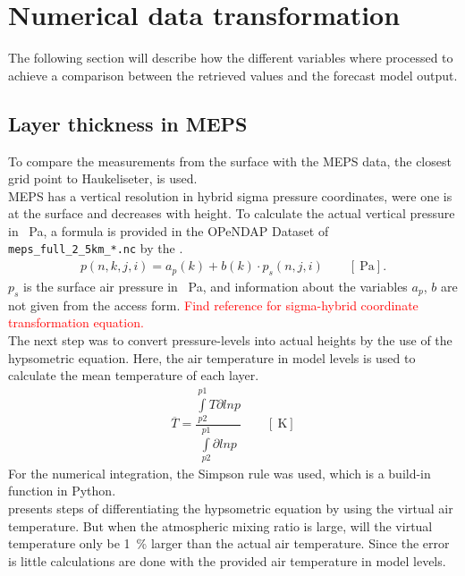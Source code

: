 \section{Numerical data transformation} \label{sec:data_proc}
The following section will describe how the different variables where processed to achieve a comparison between the retrieved values and the forecast model output. 

\subsection{Layer thickness in MEPS}\label{sec:layer_thickness}
To compare the measurements from the surface with the MEPS data, the closest grid point to Haukeliseter, is used.
\\
MEPS has a vertical resolution in hybrid sigma pressure coordinates, were one is at the surface and decreases with height. To calculate the actual vertical pressure in \SI{}{\Pa}, a formula is provided in the OPeNDAP Dataset of \texttt{meps\_full\_2\_5km\_*.nc} by the \citet{norwegian_meteorological_institute_met_2016}.  
\begin{align}
	p(n,k,j,i) = a_p(k) + b(k) \cdot p_s(n,j,i) \qquad [\SI{}{\Pa}].
	\label{eq:hybrid_sigma_pressure}
\end{align}
$p_s$ is the surface air pressure in \SI{}{\Pa}, and information about the variables $a_p$, $b$ are not given from the access form. \textcolor{red}{Find reference for sigma-hybrid coordinate transformation equation.}  
\\
The next step was to convert pressure-levels into actual heights by the use of the hypsometric equation. Here, the air temperature in model levels is used to calculate the mean temperature of each layer. 
\begin{align}
	\overline{T} = \dfrac{\int\limits_{p2}^{p1} T \partial ln p}{\int\limits_{p2}^{p1}\partial ln p} \qquad [\SI{}{\kelvin}]
	\label{eq:T_avg}
\end{align}
For the numerical integration, the Simpson rule was used, which is a build-in function in Python. \\
\citet{martin_mid-latitude_2006} presents steps of differentiating the hypsometric equation by using the virtual air temperature. But when the atmospheric mixing ratio is large, will the virtual temperature only be \SI{1}{\percent} larger than the actual air temperature. Since the error is little calculations are done with the provided air temperature in model levels.
